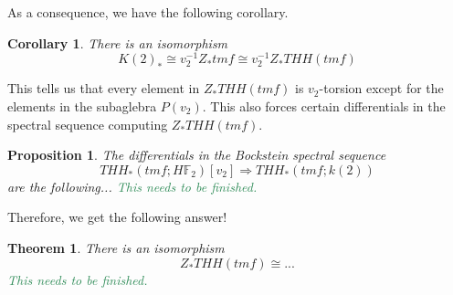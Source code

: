 \documentclass[12pt]{amsart}
\newtheorem{thm}[equation]{Theorem}
\newtheorem{cor}[equation]{Corollary}
\newtheorem{prop}[equation]{Proposition}
\theoremstyle{definition}
\numberwithin{equation}{section}
\numberwithin{figure}{section}
\begin{document}
As a consequence, we have the following corollary. 
\begin{cor}
There is an isomorphism
\[ K(2)_*\cong v_2^{-1}Z_*tmf \cong v_2^{-1}Z_*THH(tmf)\]
\end{cor}
This tells us that every element in $Z_*THH(tmf)$ is $v_2$-torsion except for the elements in the subaglebra $P(v_2)$. This also forces certain differentials in the spectral sequence computing $Z_*THH(tmf)$. 
\begin{prop}
The differentials in the Bockstein spectral sequence 
\[ THH_*(tmf;H\mathbb{F}_2)[v_2]\Rightarrow THH_*(tmf;k(2))\]
are the following... \textcolor{seagreen}{This needs to be finished.}
\end{prop}
Therefore, we get the following answer! 
\begin{thm}
There is an isomorphism 
\[ Z_*THH(tmf)\cong ...\]
\textcolor{seagreen}{This needs to be finished.}
\end{thm}



\end{document}
